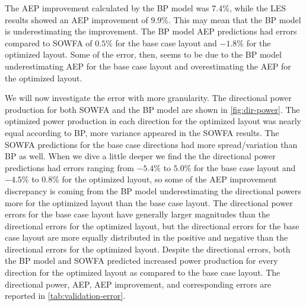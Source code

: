 \documentclass[conf]{new-aiaa}
\begin{document}
 The AEP improvement calculated by the BP model was 7.4$\%$, while the LES results showed an AEP improvement of 9.9$\%$. This may mean that the BP model is underestimating the improvement. The BP model AEP predictions had errors compared to SOWFA of $0.5\%$ for the base case layout and $-1.8\%$ for the optimized layout. Some of the error, then, seems to be due to the BP model underestimating AEP for the base case layout and overestimating the AEP for the optimized layout.

We will now investigate the error with more granularity. The directional power production for both SOWFA and the BP model are shown in \cref{fig:dir-power}. The optimized power production in each direction for the optimized layout was nearly equal according to BP, more variance appeared in the SOWFA results. The SOWFA predictions for the base case directions had more spread/variation than BP as well. When we dive a little deeper we find the the directional power predictions had errors ranging from $-5.4\%$ to $5.0\%$ for the base case layout and $-4.5\%$ to $0.8\%$ for the optimized layout, so some of the AEP improvement discrepancy is coming from the BP model underestimating the directional powers more for the optimized layout than the base case layout. The directional power errors for the base case layout have generally larger magnitudes than the directional errors for the optimized layout, but the directional errors for the base case layout are more equally distributed in the positive and negative than the directional errors for the optimized layout. Despite the directional errors, both the BP model and SOWFA predicted increased power production for every direction for the optimized layout as compared to the base case layout. The directional power, AEP, AEP improvement, and corresponding errors are reported in \cref{tab:validation-error}.
%
\end{document}
